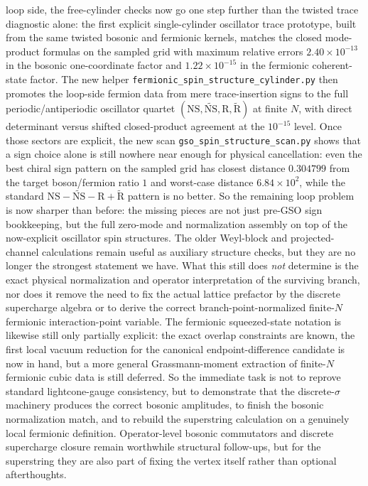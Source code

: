 \documentclass[11pt]{article}
\numberwithin{equation}{section}
\begin{document}
loop side, the free-cylinder checks now go one step further than the twisted trace diagnostic alone: the first explicit single-cylinder oscillator trace prototype, built from the same twisted bosonic and fermionic kernels, matches the closed mode-product formulas on the sampled grid with maximum relative errors $2.40\times10^{-13}$ in the bosonic one-coordinate factor and $1.22\times10^{-15}$ in the fermionic coherent-state factor. The new helper \texttt{fermionic\_spin\_structure\_cylinder.py} then promotes the loop-side fermion data from mere trace-insertion signs to the full periodic/antiperiodic oscillator quartet $(\mathrm{NS},\widetilde{\mathrm{NS}},\mathrm{R},\widetilde{\mathrm{R}})$ at finite $N$, with direct determinant versus shifted closed-product agreement at the $10^{-15}$ level. Once those sectors are explicit, the new scan \texttt{gso\_spin\_structure\_scan.py} shows that a sign choice alone is still nowhere near enough for physical cancellation: even the best chiral sign pattern on the sampled grid has closest distance $0.304799$ from the target boson/fermion ratio $1$ and worst-case distance $6.84\times 10^2$, while the standard $\mathrm{NS}-\widetilde{\mathrm{NS}}-\mathrm{R}+\widetilde{\mathrm{R}}$ pattern is no better. So the remaining loop problem is now sharper than before: the missing pieces are not just pre-GSO sign bookkeeping, but the full zero-mode and normalization assembly on top of the now-explicit oscillator spin structures. The older Weyl-block and projected-channel calculations remain useful as auxiliary structure checks, but they are no longer the strongest statement we have. What this still does \emph{not} determine is the exact physical normalization and operator interpretation of the surviving branch, nor does it remove the need to fix the actual lattice prefactor by the discrete supercharge algebra or to derive the correct branch-point-normalized finite-$N$ fermionic interaction-point variable. The fermionic squeezed-state notation is likewise still only partially explicit: the exact overlap constraints are known, the first local vacuum reduction for the canonical endpoint-difference candidate is now in hand, but a more general Grassmann-moment extraction of finite-$N$ fermionic cubic data is still deferred. So the immediate task is not to reprove standard lightcone-gauge consistency, but to demonstrate that the discrete-$\sigma$ machinery produces the correct bosonic amplitudes, to finish the bosonic normalization match, and to rebuild the superstring calculation on a genuinely local fermionic definition. Operator-level bosonic commutators and discrete supercharge closure remain worthwhile structural follow-ups, but for the superstring they are also part of fixing the vertex itself rather than optional afterthoughts.
\end{document}
